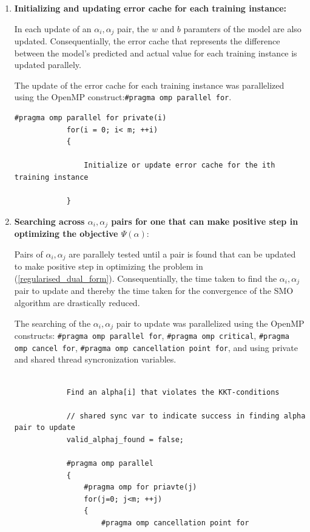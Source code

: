 \documentclass{article}
\begin{document}
	\begin{enumerate}
		\item{\textbf{Initializing and updating error cache for each training instance:}} \par
		In each update of an $\alpha_i, \alpha_j$ pair, the $w$ and $b$ paramters of the model are also updated. Consequentially, the error cache that represents the difference between the model's predicted and actual value for each training instance is updated parallely.
		
		The update of the error cache for each training instance was parallelized using the OpenMP construct:\lstinline[style=CStyle]{#pragma omp parallel for}.
		
		\begin{lstlisting}[style=CStyle]					
			#pragma omp parallel for private(i)
			for(i = 0; i< m; ++i)
			{
			
				Initialize or update error cache for the ith training instance
				
			}
		\end{lstlisting}
		
		\item {\textbf{Searching across $\alpha_i, \alpha_j$ pairs for one that can make positive step in optimizing the objective $\Psi(\alpha)$}:} \par
		Pairs of $\alpha_i, \alpha_j$ are parallely tested until a pair is found that can be updated to make positive step in optimizing the problem in (\ref{regularised_dual_form}). Consequentially, the time taken to find the $\alpha_i, \alpha_j$ pair to update and thereby the time taken for the convergence of the SMO algorithm are drastically reduced.
		
		The searching of the $\alpha_i, \alpha_j$ pair to update was parallelized using the OpenMP constructs: \lstinline[style=CStyle]{#pragma omp parallel for}, \lstinline[style=CStyle]{#pragma omp critical}, \lstinline[style=CStyle]{#pragma omp cancel for}, \lstinline[style=CStyle]{#pragma omp cancellation point for}, and using private and shared thread syncronization variables.
		
		\begin{lstlisting}[style=CStyle]	
						
			Find an alpha[i] that violates the KKT-conditions
	
			// shared sync var to indicate success in finding alpha pair to update			
			valid_alphaj_found = false;
						
			#pragma omp parallel
			{
				#pragma omp for priavte(j)
				for(j=0; j<m; ++j)
				{
					#pragma omp cancellation point for
					

\end{lstlisting}
\end{enumerate}
\end{document}
